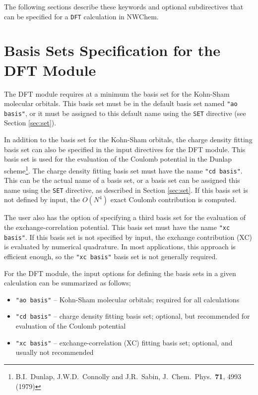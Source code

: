 The following 
sections describe these keywords and
optional subdirectives that can be specified for a \verb+DFT+ calculation
in NWChem.

\section{Basis Sets Specification for the DFT Module}
The DFT module requires at a minimum the basis set for the Kohn-Sham 
molecular orbitals.  This basis set must be in the default basis set named
{\tt "ao basis"}, or it must be assigned to this default name using the
\verb+SET+ directive (see Section \ref{sec:set}).

In addition to the basis set for the Kohn-Sham orbitals, 
the charge density fitting basis set can also be specified in the 
input directives for the DFT module.  This basis set is used for the 
evaluation of the Coulomb potential in the Dunlap scheme\footnote{B.I.~Dunlap, 
J.W.D.~Connolly and J.R.~Sabin, J.~Chem.~Phys.~{\bf 71},  4993 (1979)}.
The charge density fitting basis set must have the name {\tt "cd basis"}.
This can be the actual name of a basis set, or a basis set can be 
assigned this name using the \verb+SET+ directive, as described in
Section \ref{sec:set}.  If this basis set is not defined by input,
the $O(N^4)$ exact Coulomb contribution is computed.

The user also has the option of specifying a third basis set for the 
evaluation of the exchange-correlation potential.  This basis set must
have the name {\tt "xc basis"}.  If this basis set is not specified
by input, the exchange contribution (XC) is evaluated by numerical
quadrature.  In most applications, this approach is efficient enough,
so the {\tt "xc basis"} basis set is not generally required.

For the DFT module, the input options for defining the basis sets in a given
calculation can be summarized as follows;

\begin{itemize}
\item {\tt "ao basis"} -- Kohn-Sham molecular orbitals; required for all 
calculations

\item {\tt "cd basis"} -- charge density fitting basis set; optional, but
recommended for evaluation of the Coulomb potential

\item {\tt "xc basis"} -- exchange-correlation (XC) fitting basis set; 
optional, and usually not recommended

\end{itemize}


